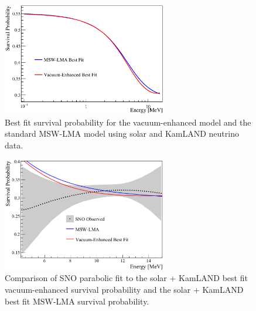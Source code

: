 \begin{figure}[htbp]
  \centering
  \includegraphics[width=0.64\textwidth]{kamland_sp_compare}
  \caption[Solar + KamLAND Best Fit Survival Probability for MSW-LMA and Vacuum-Enhanced Mixing]{
  Best fit survival probability for the vacuum-enhanced model and the standard MSW-LMA model
  using solar and KamLAND neutrino data.}
  \label{fig:solar_kamland_sp_compare}
\end{figure}

\begin{figure}[htbp]
  \centering
  \includegraphics[width=0.64\textwidth]{sno_solar_kamland_bf}
  \caption[SNO Fit Comparison for Solar + KamLAND Vacuum-Enhanced Mixing and MSW-LMA Mixing]{
  Comparison of SNO parabolic fit to the solar + KamLAND best fit vacuum-enhanced survival probability
and the solar + KamLAND  best fit MSW-LMA survival probability.}
  \label{fig:solar_kamland_sno}
\end{figure}

